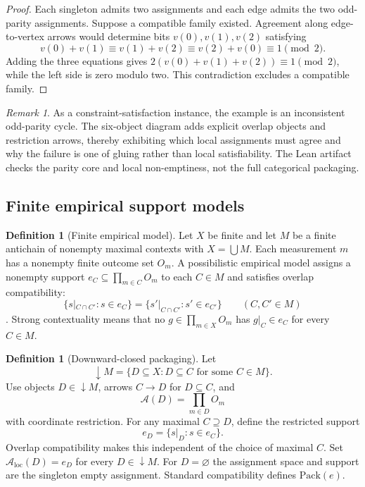 \documentclass[11pt]{article}
\theoremstyle{plain}
\theoremstyle{definition}
\newtheorem{definition}[theorem]{Definition}
\theoremstyle{remark}
\newtheorem{remark}[theorem]{Remark}
\newcommand{\LocalAdm}{\mathcal{A}_{\mathrm{loc}}}
\begin{document}
\begin{proof}
Each singleton admits two assignments and each edge admits the two odd-parity
assignments. Suppose a compatible family existed. Agreement along edge-to-vertex
arrows would determine bits $v(0),v(1),v(2)$ satisfying
\[
v(0)+v(1)\equiv v(1)+v(2)\equiv v(2)+v(0)\equiv1\pmod2.
\]
Adding the three equations gives
$2(v(0)+v(1)+v(2))\equiv1\pmod2$, while the left side is zero modulo two. This
contradiction excludes a compatible family.
\end{proof}

\begin{remark}\label{rem:triangle-lean}
As a constraint-satisfaction instance, the example is an inconsistent
odd-parity cycle. The six-object diagram adds explicit overlap objects and
restriction arrows, thereby exhibiting which local assignments must agree and
why the failure is one of gluing rather than local satisfiability. The Lean
artifact checks the parity core and local non-emptiness, not the full categorical
packaging.
\end{remark}

\subsection{Finite empirical support models}

\begin{definition}[Finite empirical model]\label{def:empirical}
Let $X$ be finite and let $M$ be a finite antichain of nonempty maximal
contexts with $X=\bigcup M$. Each measurement $m$ has a nonempty finite outcome set $O_m$.
A possibilistic empirical model assigns a nonempty support
$e_C\subseteq\prod_{m\in C}O_m$ to each $C\in M$ and satisfies overlap
compatibility:
\[
\{s|_{C\cap C'}:s\in e_C\}
=
\{s'|_{C\cap C'}:s'\in e_{C'}\}
\qquad(C,C'\in M)
\]
\cite{abramsky}. Strong contextuality means that no
$g\in\prod_{m\in X}O_m$ has $g|_C\in e_C$ for every $C\in M$.
\end{definition}

\begin{definition}[Downward-closed packaging]\label{def:packaging}
Let
\[
\downarrow M=\{D\subseteq X:D\subseteq C\text{ for some }C\in M\}.
\]
Use objects $D\in\downarrow M$, arrows $C\to D$ for $D\subseteq C$, and
\[
\mathcal A(D)=\prod_{m\in D}O_m
\]
with coordinate restriction. For any maximal $C\supseteq D$, define the
restricted support
\[
e_D=\{s|_D:s\in e_C\}.
\]
Overlap compatibility makes this independent of the choice of maximal $C$.
Set $\LocalAdm(D)=e_D$ for every $D\in\downarrow M$. For $D=\varnothing$ the
assignment space and support are the singleton empty assignment. Standard
compatibility defines $\mathrm{Pack}(e)$.
\end{definition}
\end{document}
